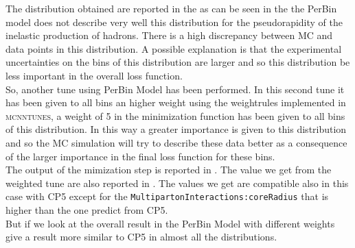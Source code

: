 The distribution obtained are reported in the  as can be seen in the  the PerBin model does not describe very well this distribution for the pseudorapidity of the inelastic production of hadrons. There is a high discrepancy between MC and data points in this distribution. A possible explanation is that the experimental uncertainties on the bins of this distribution are larger and so this distribution be less important in the overall loss function.
\\
So, another tune using PerBin Model has been performed. In this  second tune it has been given to all  bins an higher weight using the weightrules implemented in \textsc{mcnntunes}, a weight of 5 in the minimization function has been given to all bins of this distribution. In this way a greater importance is given to this distribution and so the MC simulation will try to describe these data better as a consequence of the larger importance in the final loss function for these bins.
\\
The output of the mimization step is reported in . 
The value we get from the weighted tune are also reported in . The values we get are compatible also in this case with CP5 except for the \mbox{\texttt{MultipartonInteractions:coreRadius}} that is higher than the one predict from CP5.
\\
But if we look at the overall result in 
the PerBin Model with different weights give a result more similar to CP5 in almost all the distributions. 

